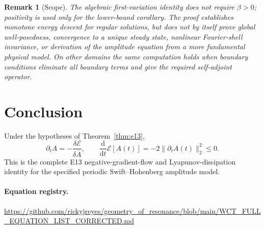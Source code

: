 \documentclass[11pt]{article}
\newtheorem{remark}{Remark}
\newcommand{\E}{\mathcal E}
\newcommand{\dd}{\mathrm d}
\begin{document}
\begin{remark}[Scope]
The algebraic first-variation identity does not require $\beta>0$;
positivity is used only for the lower-bound corollary.  The proof
establishes monotone energy descent for regular solutions, but does
not by itself prove global well-posedness, convergence to a unique
steady state, nonlinear Fourier-shell invariance, or derivation of the
amplitude equation from a more fundamental physical model.  On other
domains the same computation holds when boundary conditions eliminate
all boundary terms and give the required self-adjoint operator.
\end{remark}

\section*{Conclusion}
Under the hypotheses of Theorem~\ref{thm:e13},
\begin{equation*}
 \boxed{\displaystyle
 \partial_t A=-\frac{\delta\E}{\delta\overline A},\qquad
 \frac{\dd}{\dd t}\E[A(t)]=-2\|\partial_t A(t)\|_2^2\leq0.}
\end{equation*}
This is the complete E13 negative-gradient-flow and Lyapunov-dissipation
identity for the specified periodic Swift--Hohenberg amplitude model.

\paragraph{Equation registry.}
\url{https://github.com/rickyjreyes/geometry_of_resonance/blob/main/WCT_FULL_EQUATION_LIST_CORRECTED.md}
\end{document}
